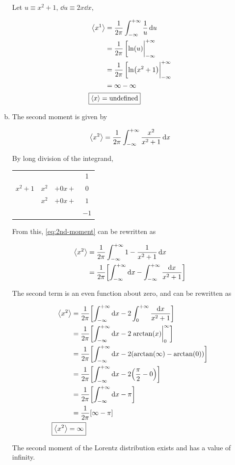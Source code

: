 \documentclass[12pt,a4paper,twocolumn]{article}
\begin{document}
\begin{enumerate}[(a)]
Let $u \equiv x^2 + 1$, $\dd{u} \equiv 2x\dd{x}$,

\begin{align}
	\ev{x^1} &= \frac{1}{2\pi} \int_{-\infty}^{+\infty} \frac{1}{u}\dd{u} \nonumber \\
	&= \frac{1}{2\pi} \eval[\ln(u)|_{-\infty}^{+\infty} \nonumber \\
	&= \frac{1}{2\pi} \eval[\ln(x^2 + 1)|_{-\infty}^{+\infty} \nonumber \\
	&= \infty - \infty \nonumber \\
	\Aboxed{
		\ev{x} &= \mathrm{undefined}
	} \label{eq:answer-b}
\end{align}

\item The second moment is given by

\begin{equation}\label{eq:2nd-moment}
	\ev{x^2} = \frac{1}{2\pi} \int_{-\infty}^{+\infty} \frac{x^2}{x^2 +1}\dd{x}
\end{equation}

By long division of the integrand,

\begin{center}
	\begin{tabular}{c|ccc}
		&&& 1 \\ \cline{2-4}
		$x^2 + 1$ & $x^2$ & $+0x+$ & $0$ \\
		& $x^2$ & $+0x+$ & $1$ \\ \cline{2-4}
		&&& $-1$
	\end{tabular}
\end{center}

From this, \eqref{eq:2nd-moment} can be rewritten as

\begin{align*}
	\ev{x^2} &= \frac{1}{2\pi} \int_{-\infty}^{+\infty} 1 - \frac{1}{x^2 + 1} \dd{x} \\
	&= \frac{1}{2\pi}\qty[\int_{-\infty}^{+\infty} \dd{x} - \int_{-\infty}^{+\infty} \frac{\dd{x}}{x^2 + 1}]
\end{align*}

The second term is an even function about zero, and can be rewritten as

\begin{align}
	\ev{x^2} &= \frac{1}{2\pi}\qty[\int_{-\infty}^{+\infty} \dd{x} - 2\int_0^{+\infty} \frac{\dd{x}}{x^2 + 1}] \nonumber \\
	&= \frac{1}{2\pi}\qty[\int_{-\infty}^{+\infty} \dd{x} - 2\eval{\arctan(x)}_0^\infty] \nonumber \\
	&= \frac{1}{2\pi}\qty[\int_{-\infty}^{+\infty} \dd{x} - 2\qty(\arctan(\infty) - \arctan(0))] \nonumber \\
	&= \frac{1}{2\pi}\qty[\int_{-\infty}^{+\infty} \dd{x} - 2\qty(\frac{\pi}{2} - 0)] \nonumber \\
	&= \frac{1}{2\pi}\qty[\int_{-\infty}^{+\infty} \dd{x} - \pi] \nonumber \\
	&= \frac{1}{2\pi} \qty[\infty - \pi] \nonumber \\
	\Aboxed{
		\ev{x^2} &= \infty
	} \label{eq:answer-c}
\end{align}

The second moment of the Lorentz distribution exists and has a value of infinity.

\end{enumerate}
\end{document}
